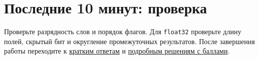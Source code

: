 \section*{Последние 10 минут: проверка}
Проверьте разрядность слов и порядок флагов. Для \texttt{float32} проверьте длину полей, скрытый бит и округление промежуточных результатов. После завершения работы переходите к \hyperref[answers:mock13]{кратким ответам} и \hyperref[solutions:mock13]{подробным решениям с баллами}.
